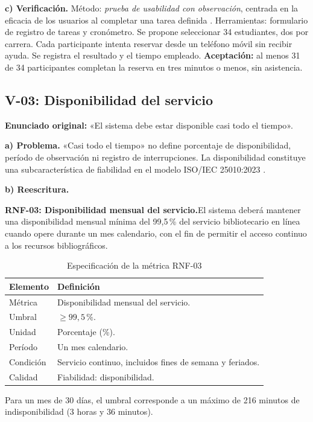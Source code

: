 \documentclass[conference,onecolumn]{IEEEtran}
\newcommand{\req}[1]{\par\noindent\textbf{#1.}\hspace{0.5em}}
\begin{document}
\textbf{c) Verificación.} Método: \emph{prueba de usabilidad con observación}, centrada en la eficacia de los usuarios al completar una tarea definida \cite{iso9241_11}. Herramientas: formulario de registro de tareas y cronómetro. Se propone seleccionar 34 estudiantes, dos por carrera. Cada participante intenta reservar desde un teléfono móvil sin recibir ayuda. Se registra el resultado y el tiempo empleado. \textbf{Aceptación:} al menos 31 de 34 participantes completan la reserva en tres minutos o menos, sin asistencia.

\subsection{V-03: Disponibilidad del servicio}
\textbf{Enunciado original:} «El sistema debe estar disponible casi todo el tiempo».

\textbf{a) Problema.} «Casi todo el tiempo» no define porcentaje de disponibilidad, período de observación ni registro de interrupciones. La disponibilidad constituye una subcaracterística de fiabilidad en el modelo ISO/IEC 25010:2023 \cite{iso25010}.

\textbf{b) Reescritura.}
\req{RNF-03: Disponibilidad mensual del servicio}El sistema deberá mantener una disponibilidad mensual mínima del 99,5\,\% del servicio bibliotecario en línea cuando opere durante un mes calendario, con el fin de permitir el acceso continuo a los recursos bibliográficos.

\begin{table}[H]
\caption{Especificación de la métrica RNF-03}
\label{tab:rnf3}
\footnotesize\centering
\begin{tabularx}{\columnwidth}{@{}p{}Y@{}}
\toprule
\textbf{Elemento} & \textbf{Definición}\\
\midrule
Métrica & Disponibilidad mensual del servicio.\\
Umbral & $\geq 99{,}5\,\%$.\\
Unidad & Porcentaje (\%).\\
Período & Un mes calendario.\\
Condición & Servicio continuo, incluidos fines de semana y feriados.\\
Calidad & Fiabilidad: disponibilidad.\\
\bottomrule
\end{tabularx}
\end{table}

Para un mes de 30 días, el umbral corresponde a un máximo de 216 minutos de indisponibilidad (3 horas y 36 minutos).
\end{document}
